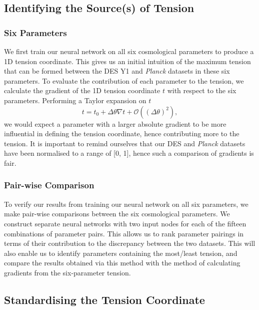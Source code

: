 \documentclass[%
 reprint,
 amsmath,amssymb,
 aps,
]{revtex4-2}
\begin{document}
\subsection{Identifying the Source(s) of Tension} \label{section:source}

\subsubsection{Six Parameters}

We first train our neural network on all six cosmological parameters to produce a 1D tension coordinate. This gives us an initial intuition of the maximum tension that can be formed between the DES Y1 and \textit{Planck} datasets in these six parameters. To evaluate the contribution of each parameter to the tension, we calculate the gradient of the 1D tension coordinate $t$ with respect to the six parameters. Performing a Taylor expansion on $t$
\begin{equation}
    t = t_0 + \Delta \theta \nabla t + \mathcal{O}((\Delta \theta)^2),
\end{equation}
we would expect a parameter with a larger absolute gradient to be more influential in defining the tension coordinate, hence contributing more to the tension. It is important to remind ourselves that our DES and \textit{Planck} datasets have been normalised to a range of [0, 1], hence such a comparison of gradients is fair.

\subsubsection{Pair-wise Comparison}

To verify our results from training our neural network on all six parameters, we make pair-wise comparisons between the six cosmological parameters. We construct separate neural networks with two input nodes for each of the fifteen combinations of parameter pairs. This allows us to rank parameter pairings in terms of their contribution to the discrepancy between the two datasets. This will also enable us to identify parameters containing the most/least tension, and compare the results obtained via this method with the method of calculating gradients from the six-parameter tension.


\subsection{Standardising the Tension Coordinate}
\end{document}
